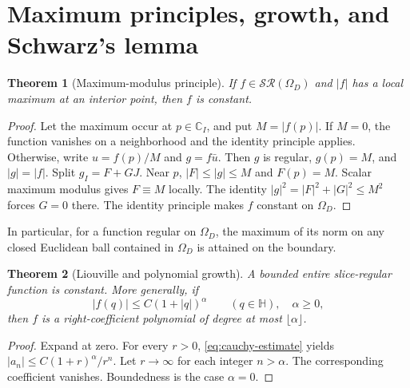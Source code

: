 \documentclass[11pt,a4paper]{article}
\numberwithin{equation}{section}
\newtheorem{theorem}{Theorem}[section]
\theoremstyle{definition}
\theoremstyle{remark}
\newcommand{\C}{\mathbb C}
\newcommand{\HH}{\mathbb H}
\newcommand{\SR}{\mathcal{SR}}
\begin{document}
\section{Maximum principles, growth, and Schwarz's lemma}
\label{sec:maximum}
\begin{theorem}[Maximum-modulus principle]
\label{thm:max}
If $f\in\SR(\Omega_D)$ and $|f|$ has a local maximum at an interior point,
then $f$ is constant.
\end{theorem}
\begin{proof}
Let the maximum occur at $p\in\C_I$, and put $M=|f(p)|$. If $M=0$, the
function vanishes on a neighborhood and the identity principle applies.
Otherwise, write $u=f(p)/M$ and $g=f\bar u$. Then $g$ is regular, $g(p)=M$,
and $|g|=|f|$. Split $g_I=F+GJ$. Near $p$, $|F|\le|g|\le M$ and
$F(p)=M$. Scalar maximum modulus gives $F\equiv M$ locally. The identity
$|g|^2=|F|^2+|G|^2\le M^2$ forces $G=0$ there. The identity principle
makes $f$ constant on $\Omega_D$.
\end{proof}
In particular, for a function regular on $\Omega_D$, the maximum of its
norm on any closed Euclidean ball contained in $\Omega_D$ is attained on
the boundary.

\begin{theorem}[Liouville and polynomial growth]
\label{thm:liouville-slice}
A bounded entire slice-regular function is constant. More generally, if
\[
 |f(q)|\le C(1+|q|)^\alpha\qquad(q\in\HH),\quad \alpha\ge0,
\]
then $f$ is a right-coefficient polynomial of degree at most $\lfloor\alpha\rfloor$.
\end{theorem}
\begin{proof}
Expand at zero. For every $r>0$, \eqref{eq:cauchy-estimate} yields
$|a_n|\le C(1+r)^\alpha/r^n$. Let $r\to\infty$ for each integer $n>\alpha$.
The corresponding coefficient vanishes. Boundedness is the case $\alpha=0$.
\end{proof}
\end{document}
